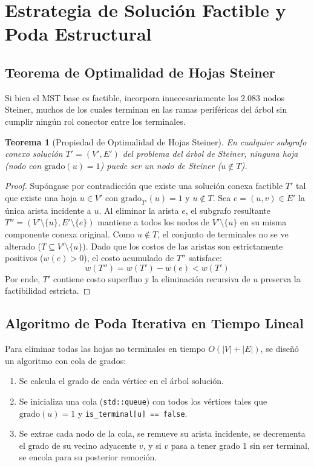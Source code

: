 \documentclass[11pt,a4paper]{article}
\newtheorem{theorem}{Teorema}
\begin{document}
\section{Estrategia de Solución Factible y Poda Estructural}
\label{sec:poda}

\subsection{Teorema de Optimalidad de Hojas Steiner}
Si bien el MST base es factible, incorpora innecesariamente los $2.083$ nodos Steiner, muchos de los cuales terminan en las ramas periféricas del árbol sin cumplir ningún rol conector entre los terminales.

\begin{theorem}[Propiedad de Optimalidad de Hojas Steiner]
En cualquier subgrafo conexo solución $T' = (V', E')$ del problema del árbol de Steiner, ninguna hoja (nodo con $\text{grado}(u) = 1$) puede ser un nodo de Steiner ($u \notin T$).
\end{theorem}

\begin{proof}
Supóngase por contradicción que existe una solución conexa factible $T'$ tal que existe una hoja $u \in V'$ con $\text{grado}_{T'}(u) = 1$ y $u \notin T$. Sea $e = (u, v) \in E'$ la única arista incidente a $u$. Al eliminar la arista $e$, el subgrafo resultante $T'' = (V' \setminus \{u\}, E' \setminus \{e\})$ mantiene a todos los nodos de $V' \setminus \{u\}$ en su misma componente conexa original. Como $u \notin T$, el conjunto de terminales no se ve alterado ($T \subseteq V' \setminus \{u\}$). Dado que los costos de las aristas son estrictamente positivos ($w(e) > 0$), el costo acumulado de $T''$ satisface:
\begin{equation}
    w(T'') = w(T') - w(e) < w(T')
\end{equation}
Por ende, $T'$ contiene costo superfluo y la eliminación recursiva de $u$ preserva la factibilidad estricta.
\end{proof}

\subsection{Algoritmo de Poda Iterativa en Tiempo Lineal}
Para eliminar todas las hojas no terminales en tiempo $O(|V| + |E|)$, se diseñó un algoritmo con cola de grados:
\begin{enumerate}
    \item Se calcula el grado de cada vértice en el árbol solución.
    \item Se inicializa una cola (\texttt{std::queue}) con todos los vértices tales que $\text{grado}(u) = 1$ y \texttt{is\_terminal[u] == false}.
    \item Se extrae cada nodo de la cola, se remueve su arista incidente, se decrementa el grado de su vecino adyacente $v$, y si $v$ pasa a tener grado 1 sin ser terminal, se encola para su posterior remoción.
\end{enumerate}
\end{document}
